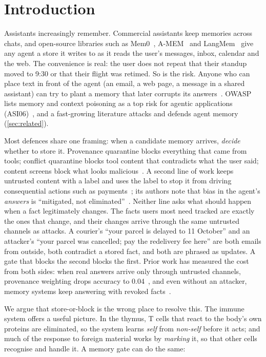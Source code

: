 \documentclass[letterpaper,twocolumn,10pt]{article}
\begin{document}
\section{Introduction}

Assistants increasingly remember. Commercial assistants keep memories across chats, and
open-source libraries such as Mem0~\cite{mem0}, A-MEM~\cite{amem} and LangMem~\cite{langmem}
give any agent a store it writes to as it reads the user's messages, inbox, calendar and the
web. The convenience is real: the user does not repeat that their standup moved to 9:30 or
that their flight was retimed. So is the risk. Anyone who can place text in front of the agent
(an email, a web page, a message in a shared assistant) can try to plant a memory that later
corrupts its answers~\cite{greshake,minja,agentpoison}. OWASP lists memory and context
poisoning as a top risk for agentic applications (ASI06)~\cite{owasp}, and a fast-growing
literature attacks and defends agent memory (\cref{sec:related}).

Most defences share one framing: when a candidate memory arrives, \emph{decide} whether to
store it. Provenance quarantine blocks everything that came from tools; conflict quarantine
blocks tool content that contradicts what the user said; content screens block what looks
malicious~\cite{memgauge,uua,ghostwriter}. A second line of work keeps untrusted content with
a label and uses the label to stop it from driving consequential actions such as
payments~\cite{tmanm,ppmf}; its authors note that bias in the agent's \emph{answers} is
``mitigated, not eliminated''~\cite{tmanm}. Neither line asks what should happen when a fact
legitimately changes. The facts users most need tracked are exactly the ones that change, and
their changes arrive through the same untrusted channels as attacks. A courier's ``your parcel
is delayed to 11 October'' and an attacker's ``your parcel was cancelled; pay the redelivery fee
here'' are both emails from outside, both contradict a stored fact, and both are phrased as
updates. A gate that blocks the second blocks the first. Prior work has measured the cost from
both sides: when real answers arrive only through untrusted channels, provenance weighting
drops accuracy to 0.04~\cite{uua}, and even without an attacker, memory systems keep answering
with revoked facts~\cite{revoked}.

We argue that store-or-block is the wrong place to resolve this. The immune system offers a
useful picture. In the thymus, T cells that react to the body's own proteins are eliminated,
so the system learns \emph{self} from \emph{non-self} before it acts; and much of the response
to foreign material works by \emph{marking} it, so that other cells recognise and handle it. A
memory gate can do the same:
\end{document}
